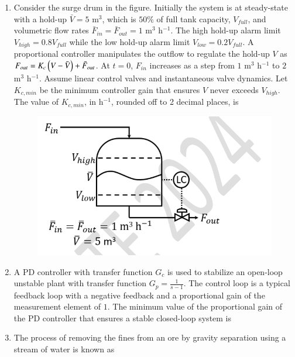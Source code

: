 \documentclass[journal,12pt,onecolumn]{IEEEtran}
\theoremstyle{remark}
\begin{document}
\begin{enumerate}
	\hfill{}
	
	\item Consider the surge drum in the figure. Initially the system is at steady-state with a hold-up $\bar{V} = 5$ m$^3$, which is $50\%$ of full tank capacity, $V_{full}$, and volumetric flow rates $\bar{F}_{in} = \bar{F}_{out} = 1$ m$^3$ h$^{-1}$. The high hold-up alarm limit $V_{high} = 0.8 V_{full}$ while the low hold-up alarm limit $V_{low} = 0.2 V_{full}$. A proportional  controller manipulates the outflow to regulate the hold-up $V$ as $F_{out} = K_c\left(V - \bar{V}\right) + \bar{F}_{out}$. At $t=0$, $F_{in}$ increases as a step from $1$ m$^3$ h$^{-1}$ to $2$ m$^3$ h$^{-1}$. Assume linear control valves and instantaneous valve dynamics. Let $K_{c,min}$ be the minimum controller gain that ensures $V$ never exceeds $V_{high}$. The value of $K_{c,min}$, in h$^{-1}$, rounded off to 2 decimal places, is \underline{\hspace{2cm}}
	\begin{figure}
		\includegraphics[width = 0.8\columnwidth]{q63}
		\caption*{}
		\label{fig:q63}
	\end{figure}
	
	\hfill{}
	
	\item A PD controller with transfer function $G_c$ is used to stabilize an open-loop unstable plant with transfer function $G_p = \frac{1}{s-1}$. The control loop is a typical feedback loop with a negative feedback and a proportional gain of the measurement element of $1$. The minimum value of the proportional gain of the PD controller that ensures a stable closed-loop system is \underline{\hspace{2cm}}
	
	\hfill{}
	
	\item The process of removing the fines from an ore by gravity separation using a stream of water is known as \underline{\hspace{2cm}}
	
	\hfill{}
	
	\end{enumerate}
	
\end{document}
